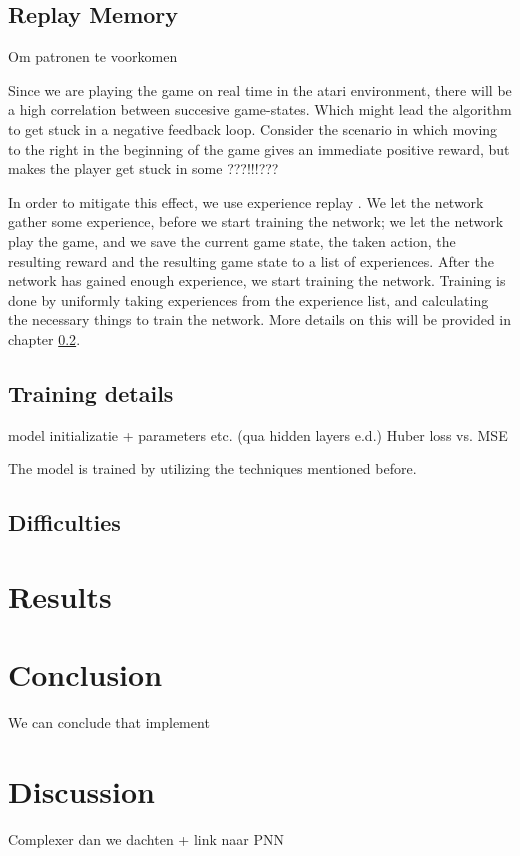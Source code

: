 \documentclass{article}
\begin{document}
\subsection{Replay Memory}
Om patronen te voorkomen \cite{mnih2013playing}

Since we are playing the game on real time in the atari environment, there will be a high correlation between succesive game-states. Which might lead the algorithm to get stuck in a negative feedback loop. Consider the scenario in which moving to the right in the beginning of the game gives an immediate positive reward, but makes the player get stuck in some ???!!!???

In order to mitigate this effect, we use experience replay \cite{mnih2013playing}. We let the network gather some experience, before we start training the network; we let the network play the game, and we save the current game state, the taken action, the resulting reward and the resulting game state to a list of experiences. After the network has gained enough experience, we start training the network. Training is done by uniformly taking experiences from the experience list, and calculating the necessary things to train the network. More details on this will be provided in  chapter \ref{chapter:training}.

\subsection{Training details} \label{chapter:training}
model initializatie + parameters etc. (qua hidden layers e.d.)
Huber loss vs. MSE

The model is trained by utilizing the techniques mentioned before. 

\subsection{Difficulties}



\section{Results}


\section{Conclusion}

We can conclude that implement

\section{Discussion}
Complexer dan we dachten + link naar PNN

\cite{*}


\end{document}
